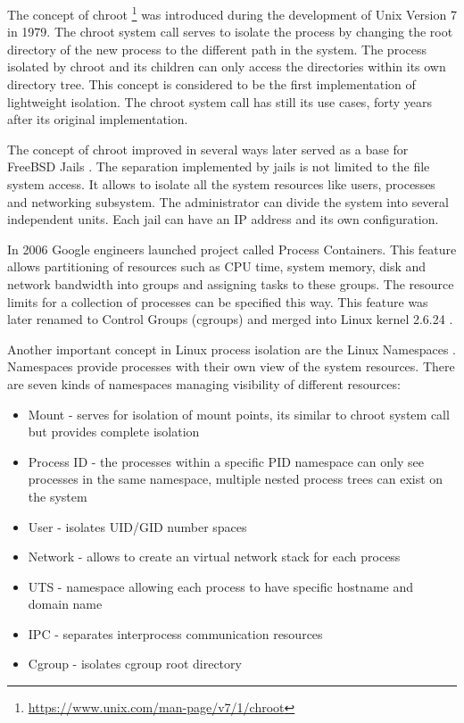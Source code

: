 \documentclass[
  digital, %
  twoside, %
  table,   %
  lof,     %
  lot,     %
]{fithesis3}
\begin{document}
The concept of chroot \footnote{\url{https://www.unix.com/man-page/v7/1/chroot}} was introduced during the development of Unix Version 7 in 1979. The chroot system call serves to isolate the process by changing the root directory of the new process to the different path in the system. The process isolated by chroot and its children can only access the directories within its own directory tree. This concept is considered to be the first implementation of lightweight isolation. The chroot system call has still its use cases, forty years after its original implementation.

The concept of chroot improved in several ways later served as a base for FreeBSD Jails \cite{freebsd_jails}. The separation implemented by jails is not limited to the file system access. It allows to isolate all the system resources like users, processes and networking subsystem. The administrator can divide the system into several independent units. Each jail can have an IP address and its own configuration.

In 2006 Google engineers launched project called Process Containers. This feature allows partitioning of resources such as CPU time, system memory, disk and network bandwidth into groups and assigning tasks to these groups. The resource limits for a collection of processes can be specified this way. This feature was later renamed to Control Groups (cgroups) and merged into Linux kernel 2.6.24 \cite{cgroups}.

Another important concept in Linux process isolation are the Linux Namespaces \cite{namespaces}. Namespaces provide processes with their own view of the system resources. There are seven kinds of namespaces managing visibility of different resources:
\begin{itemize}
  \item Mount - serves for isolation of mount points, its similar to chroot system call but provides complete isolation
  \item Process ID - the processes within a specific PID namespace can only see processes in the same namespace, multiple nested process trees can exist on the system
  \item User - isolates UID/GID number spaces
  \item Network - allows to create an virtual network stack for each process
  \item UTS - namespace allowing each process to have specific hostname and domain name
  \item IPC - separates interprocess communication resources
  \item Cgroup - isolates cgroup root directory
\end{itemize}
\end{document}
